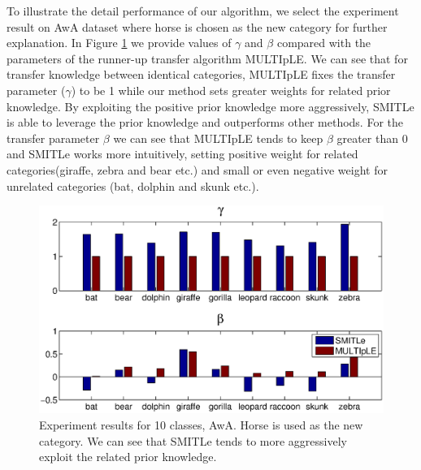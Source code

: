 To illustrate the detail performance of our algorithm, we select the experiment result on AwA dataset where horse is chosen as the new category for further explanation. %
In Figure \ref{fig:awa} we provide values of $\gamma$ and $\beta$ compared with the parameters of the runner-up transfer algorithm MULTIpLE. We can see that for transfer knowledge between identical categories, MULTIpLE fixes the transfer parameter ($\gamma$) to be 1 while our method sets greater weights for related prior knowledge. By exploiting the positive prior knowledge more aggressively, SMITLe is able to leverage the prior knowledge and outperforms other methods. For the transfer parameter $\beta$ we can see that MULTIpLE tends to keep $\beta$ greater than 0 and SMITLe works more intuitively, setting positive weight for related categories(giraffe, zebra and bear etc.) and small or even negative weight for unrelated categories (bat, dolphin and skunk etc.).


\begin{figure}
\centering
\includegraphics[scale=0.3]{fig/A2A_gama.eps} %
\caption{Experiment results for 10 classes, AwA. Horse is used as the new category. We can see that SMITLe tends to more aggressively exploit the related prior knowledge.}
\label{fig:awa}
\end{figure}



